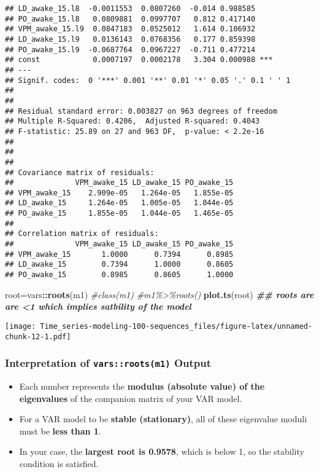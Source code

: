 \documentclass[
]{article}
\newenvironment{Shaded}{\begin{snugshade}}{\end{snugshade}}
\newcommand{\CommentTok}[1]{\textcolor[rgb]{0.56,0.35,0.01}{\textit{#1}}}
\newcommand{\DocumentationTok}[1]{\textcolor[rgb]{0.56,0.35,0.01}{\textbf{\textit{#1}}}}
\newcommand{\FunctionTok}[1]{\textcolor[rgb]{0.13,0.29,0.53}{\textbf{#1}}}
\newcommand{\NormalTok}[1]{#1}
\newcommand{\OtherTok}[1]{\textcolor[rgb]{0.56,0.35,0.01}{#1}}
\newcommand{\SpecialCharTok}[1]{\textcolor[rgb]{0.81,0.36,0.00}{\textbf{#1}}}
\providecommand{\tightlist}{%
  \setlength{\itemsep}{0pt}\setlength{\parskip}{0pt}}
\begin{document}
\begin{verbatim}
## LD_awake_15.l8  -0.0011553  0.0807260  -0.014 0.988585    
## PO_awake_15.l8   0.0809881  0.0997707   0.812 0.417140    
## VPM_awake_15.l9  0.0847183  0.0525012   1.614 0.106932    
## LD_awake_15.l9   0.0136143  0.0768356   0.177 0.859398    
## PO_awake_15.l9  -0.0687764  0.0967227  -0.711 0.477214    
## const            0.0007197  0.0002178   3.304 0.000988 ***
## ---
## Signif. codes:  0 '***' 0.001 '**' 0.01 '*' 0.05 '.' 0.1 ' ' 1
## 
## 
## Residual standard error: 0.003827 on 963 degrees of freedom
## Multiple R-Squared: 0.4206,  Adjusted R-squared: 0.4043 
## F-statistic: 25.89 on 27 and 963 DF,  p-value: < 2.2e-16 
## 
## 
## 
## Covariance matrix of residuals:
##              VPM_awake_15 LD_awake_15 PO_awake_15
## VPM_awake_15    2.909e-05   1.264e-05   1.855e-05
## LD_awake_15     1.264e-05   1.005e-05   1.044e-05
## PO_awake_15     1.855e-05   1.044e-05   1.465e-05
## 
## Correlation matrix of residuals:
##              VPM_awake_15 LD_awake_15 PO_awake_15
## VPM_awake_15       1.0000      0.7394      0.8985
## LD_awake_15        0.7394      1.0000      0.8605
## PO_awake_15        0.8985      0.8605      1.0000
\end{verbatim}

\begin{Shaded}
\begin{Highlighting}[]
\NormalTok{root}\OtherTok{=}\NormalTok{vars}\SpecialCharTok{::}\FunctionTok{roots}\NormalTok{(m1)}
\CommentTok{\#class(m1)}
\CommentTok{\#m1\%\textgreater{}\%roots()}
\FunctionTok{plot.ts}\NormalTok{(root)  }\DocumentationTok{\#\# roots are are \textless{}1 which implies satbility of the model}
\end{Highlighting}
\end{Shaded}

\texttt{[image: Time\_series-modeling-100-sequences\_files/figure-latex/unnamed-chunk-12-1.pdf]}

\hypertarget{interpretation-of-varsrootsm1-output}{%
\subsubsection{\texorpdfstring{Interpretation of
\texttt{vars::roots(m1)}
Output}{Interpretation of vars::roots(m1) Output}}\label{interpretation-of-varsrootsm1-output}}

\begin{itemize}
\tightlist
\item
  Each number represents the \textbf{modulus (absolute value) of the
  eigenvalues} of the companion matrix of your VAR model.
\item
  For a VAR model to be \textbf{stable (stationary)}, all of these
  eigenvalue moduli must be \textbf{less than 1}.
\item
  In your case, the \textbf{largest root is 0.9578}, which is below 1,
  so the stability condition is satisfied.
\end{itemize}
\end{document}
